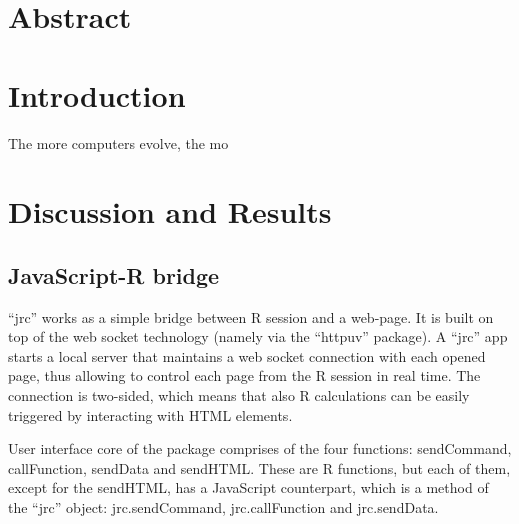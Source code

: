 \documentclass[twocolumn,10pt]{article}
\begin{document}
\setcounter{secnumdepth}{0}



\section{Abstract}

\section{Introduction}

The more computers evolve, the mo

\section{Discussion and Results}
\subsection{JavaScript-R bridge}

``jrc'' works as a simple bridge between R session and a web-page. It is built on top of the web socket technology (namely via the ``httpuv'' package). A ``jrc'' app starts a local server that maintains a web socket connection with each opened page, thus allowing to control each page from the R session in real time. The connection is two-sided, which means that also R calculations can be easily triggered by interacting with HTML elements.

User interface core of the package comprises of the four functions: sendCommand, callFunction, sendData and sendHTML. These are R functions, but each of them, except for the sendHTML, has a JavaScript counterpart, which is a method of the ``jrc'' object: jrc.sendCommand, jrc.callFunction and jrc.sendData. 
 
\end{document}
